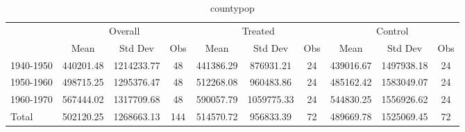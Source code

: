 \begin{table}[htbp]\centering
\def\sym#1{\ifmmode^{#1}\else\(^{#1}\)\fi}
\caption{countypop \label{tab1}}
\begin{tabular}{l*{3}{ccc}}
\toprule
                    &\multicolumn{3}{c}{Overall}           &\multicolumn{3}{c}{Treated}           &\multicolumn{3}{c}{Control}           \\
                    &        Mean&     Std Dev&         Obs&        Mean&     Std Dev&         Obs&        Mean&     Std Dev&         Obs\\
\midrule
1940-1950           &   440201.48&  1214233.77&          48&   441386.29&   876931.21&          24&   439016.67&  1497938.18&          24\\
1950-1960           &   498715.25&  1295376.47&          48&   512268.08&   960483.86&          24&   485162.42&  1583049.07&          24\\
1960-1970           &   567444.02&  1317709.68&          48&   590057.79&  1059775.33&          24&   544830.25&  1556926.62&          24\\
Total               &   502120.25&  1268663.13&         144&   514570.72&   956833.39&          72&   489669.78&  1525069.45&          72\\
\bottomrule
\end{tabular}
\end{table}
